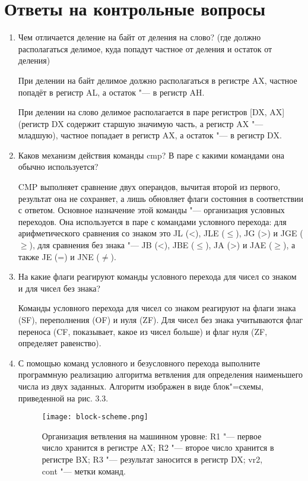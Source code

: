 \documentclass[bachelor, och, otchet]{SCWorks}
\begin{document}
\section{Ответы на контрольные вопросы}
\begin{enumerate}
\item Чем отличается деление на байт от деления на слово? (где должно располагаться делимое, куда попадут частное от деления и остаток от деления)

При делении на байт делимое должно располагаться в регистре AX, частное попадёт в регистр AL, а остаток "--- в регистр AH.

При делении на слово делимое располагается в паре регистров [DX, AX] (регистр DX содержит старшую значимую часть, а регистр AX "--- младшую), частное попадает в регистр AX, а остаток "--- в регистр DX.
\item Каков механизм действия команды cmp? В паре с какими командами она обычно используется?

CMP выполняет сравнение двух операндов, вычитая второй из первого, результат она не сохраняет, а лишь обновляет флаги состояния в соответствии с ответом. Основное назначение этой команды "--- организация условных переходов. Она используется в паре с командами условного перехода: для арифметического сравнения со знаком это JL (<), JLE ($\leq$), JG (>) и JGE ($\geq$), для сравнения без знака "--- JB (<), JBE ($\leq$), JA (>) и JAE ($\geq$), а также JE (=) и JNE ($\ne$).

\item На какие флаги реагируют команды условного перехода для чисел со знаком и для чисел без знака?

Команды условного перехода для чисел со знаком реагируют на флаги знака (SF), переполнения (OF) и нуля (ZF). Для чисел без знака учитываются флаг переноса (CF, показывает, какое из чисел больше) и флаг нуля (ZF, определяет равенство).

\item С помощью команд условного и безусловного перехода выполните программную реализацию алгоритма ветвления для определения наименьшего числа из двух заданных. Алгоритм изображен в виде блок"=схемы, приведенной на рис. 3.3.

\begin{figure}[H]
\centering
\texttt{[image: block-scheme.png]}
\caption{Организация ветвления на машинном уровне: \newline
R1 "--- первое число хранится в регистре AX; \newline
R2 "--- второе число хранится в регистре BX; \newline
R3 "--- результат заносится в регистр DX; \newline
vr2, cont "--- метки команд. \newline}
\end{figure}


\end{enumerate}
\end{document}
